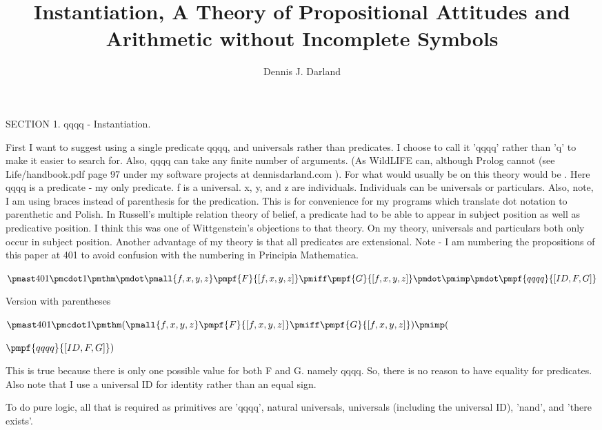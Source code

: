 \documentclass[12pt]{article}
\begin{document}
\title{Instantiation, A Theory of Propositional Attitudes and Arithmetic without Incomplete Symbols}
\author{Dennis J. Darland}
\maketitle

SECTION 1. qqqq - Instantiation.

First I want to suggest using a single predicate qqqq, and universals rather than predicates. I choose to call it 'qqqq' rather than 'q' to make it easier to
search for. Also, qqqq can take any finite number of arguments. (As WildLIFE can, although Prolog cannot (see Life/handbook.pdf page 97 under my software projects at dennisdarland.com ). For what would usually be  on this theory would be  . Here qqqq is a predicate - my only predicate. f is a universal. x, y, and z are individuals. Individuals can be universals or particulars. Also, note, I am using braces instead of parenthesis for the predication. This is for convenience for my programs which translate dot notation to parenthetic and Polish. In Russell's multiple relation theory of belief, a predicate had to be able to appear in subject position as well as predicative position. I think this was one of Wittgenstein's objections to that theory. On my theory, universals and particulars both only occur in subject position. Another advantage of my theory is that all predicates are extensional. Note - I am numbering the propositions of this paper at 401 to avoid confusion with the numbering in Principia Mathematica.

$\pmast 401 \pmcdot 1 \pmthm \pmdot \pmall{f, x, y, z} \pmpf{F}{[f,x,y,z]} \pmiff \pmpf{G}{[f,x,y,z]} \pmdot \pmimp \pmdot \pmpf{qqqq}{[ID,F,G]} $
 
 

Version with parentheses

$\pmast 401 \pmcdot 1 \pmthm  (  \pmall{f, x, y, z} \pmpf{F}{[f,x,y,z]} \pmiff \pmpf{G}{[f,x,y,z]}  ) \pmimp (  $

$\pmpf{qqqq}{[ID,F,G]} )$


This is true because there is only one possible value for both F and G. namely qqqq. So, there is no reason to have equality for predicates. Also note that I use a universal ID for identity rather than an equal sign.

To do pure logic, all that is required as primitives are 'qqqq', natural universals, universals (including the universal ID), 'nand', and 'there exists'.  
\end{document}
